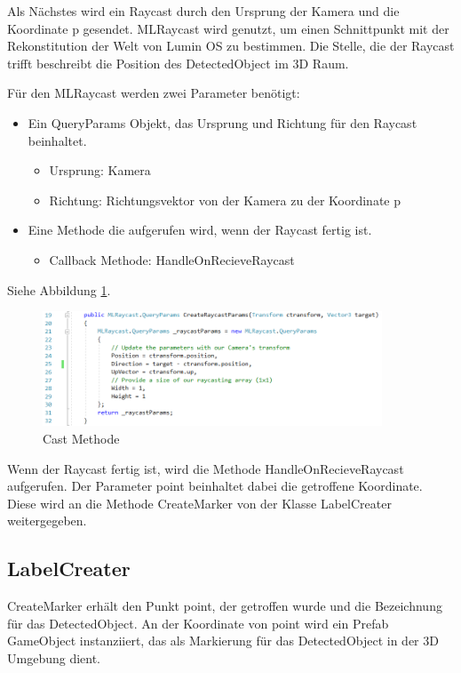 \documentclass[german,a4paper, 12pt]{llncs}
\begin{document}
Als Nächstes wird ein Raycast durch den Ursprung der Kamera und die Koordinate p gesendet. MLRaycast wird genutzt, um einen Schnittpunkt mit der Rekonstitution der Welt von Lumin OS zu bestimmen. Die Stelle, die der Raycast trifft beschreibt die Position des DetectedObject im 3D Raum.

Für den MLRaycast werden zwei Parameter benötigt:
\begin{itemize}
	\item Ein QueryParams Objekt, das Ursprung und Richtung für den Raycast beinhaltet.
	\begin{itemize}
		\item Ursprung: Kamera
		\item Richtung: Richtungsvektor von der Kamera zu der Koordinate p
	\end{itemize}
	\item Eine Methode die aufgerufen wird, wenn der Raycast fertig ist. 
		\begin{itemize}
		\item Callback Methode: HandleOnRecieveRaycast
	\end{itemize}
\end{itemize}

Siehe Abbildung \ref{code:raycastparams}.

\begin{figure}[H]
	\centering
	\includegraphics[width=0.9\textwidth]{images/code_raycastparams.PNG}
	\caption[]{Cast Methode}
	\label{code:raycastparams}
\end{figure}

Wenn der Raycast fertig ist, wird die Methode HandleOnRecieveRaycast aufgerufen. Der Parameter point beinhaltet dabei die getroffene Koordinate.
Diese wird an die Methode CreateMarker von der Klasse LabelCreater weitergegeben.

\subsection{LabelCreater}

CreateMarker erhält den Punkt point, der getroffen wurde und die Bezeichnung für das DetectedObject. An der Koordinate von point wird ein Prefab GameObject instanziiert, das als Markierung für das DetectedObject in der 3D Umgebung dient.
\end{document}
